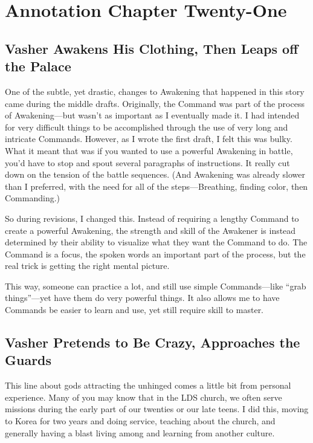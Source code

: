 \section{Annotation Chapter Twenty-One}

\subsection*{Vasher Awakens His Clothing, Then Leaps off the Palace}

One of the subtle, yet drastic, changes to Awakening that happened in this story came during the middle drafts. Originally, the Command was part of the process of Awakening—but wasn’t as important as I eventually made it. I had intended for very difficult things to be accomplished through the use of very long and intricate Commands. However, as I wrote the first draft, I felt this was bulky. What it meant that was if you wanted to use a powerful Awakening in battle, you’d have to stop and spout several paragraphs of instructions. It really cut down on the tension of the battle sequences. (And Awakening was already slower than I preferred, with the need for all of the steps—Breathing, finding color, then Commanding.)

So during revisions, I changed this. Instead of requiring a lengthy Command to create a powerful Awakening, the strength and skill of the Awakener is instead determined by their ability to visualize what they want the Command to do. The Command is a focus, the spoken words an important part of the process, but the real trick is getting the right mental picture.

This way, someone can practice a lot, and still use simple Commands—like “grab things”—yet have them do very powerful things. It also allows me to have Commands be easier to learn and use, yet still require skill to master.

\subsection*{Vasher Pretends to Be Crazy, Approaches the Guards}

This line about gods attracting the unhinged comes a little bit from personal experience. Many of you may know that in the LDS church, we often serve missions during the early part of our twenties or our late teens. I did this, moving to Korea for two years and doing service, teaching about the church, and generally having a blast living among and learning from another culture.

